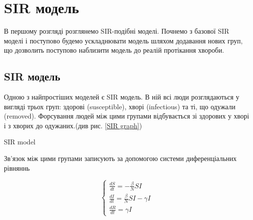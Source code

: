 \chapter{SIR модель}
В першому розгляді розглянемо SIR-подібні моделі. Почнемо з базової 
SIR моделі і поступово будемо ускладнювати модель шляхом додавання
нових груп, що дозволить поступово наблизити модель до реалій протікання
хвороби.

\section{SIR модель}
\par Одною з найпростіших моделей є SIR модель. 
В ній всі люди розглядаються у вигляді трьох груп: здорові (susceptible), хворі (infectious) та ті, що одужали (removed). 
Форсування людей між цими групами відбувається зі здорових у хворі 
і з хворих до одужаних.(див рис. \ref{SIR graph})  

\vspace{1cm}
\begin{risunok}[ht]
    \centering
    \vspace{0.5cm}
    \caption{SIR model}
    \label{SIR graph}
\end{risunok}

Зв’язок між цими групами записують за допомогою системи диференціальних рівняннь 

\begin{equation*}
    \begin{cases}
        \frac{dS}{dt} = - \frac{\beta}{N}SI          \\
        \frac{dI}{dt} = \frac{\beta}{N}SI - \gamma I \\
        \frac{dR}{dt} = \gamma I
    \end{cases}
\end{equation*}


